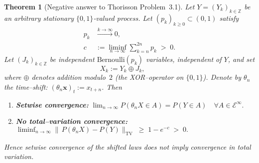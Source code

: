 \documentclass[11pt]{article}
\newtheorem{theorem}{Theorem}
\begin{document}
\begin{theorem}[Negative answer to Thorisson Problem~3.1]
Let $Y=(Y_k)_{k\in\mathbb Z}$ be an \emph{arbitrary} stationary $\{0,1\}$‑valued process.
Let $(p_k)_{k\ge0}\subset(0,1)$ satisfy
\begin{subequations}\label{eq:pconds}
\begin{align}
  p_k &\xrightarrow{k\to\infty} 0, \label{eq:p1}\\
  c  &:= \liminf_{n\to\infty}\sum_{k=n}^{2n}p_k \;>\;0. \label{eq:p2}
\end{align}
\end{subequations}
Let $(J_k)_{k\in\mathbb Z}$ be independent $\mathrm{Bernoulli}(p_k)$ variables, independent of $Y$, and set
\[
  X_k := Y_k \oplus J_k,\qquad
\]
where $\oplus$ denotes addition modulo~$2$ (the XOR–operator on $\{0,1\}$).
Denote by $\theta_n$ the time–shift: $(\theta_n\bm x)_t := x_{t+n}$.
Then
\begin{enumerate}[label=\textup{(\alph*)}]
  \item \textbf{Setwise convergence:}
        \(
          \displaystyle
          \lim_{n\to\infty} P(\theta_n X\in A)=P(Y\in A)
          \quad\forall A\in\mathcal E^{\infty}.
        \)
  \item \textbf{No total–variation convergence:}
        \(
          \displaystyle
          \liminf_{n\to\infty}
          \bigl\|\,P(\theta_n X)-P(Y)\bigr\|_{\mathrm{TV}}
          \;\ge\;1-e^{-c}\;>\;0.
        \)
\end{enumerate}
Hence setwise convergence of the shifted laws does not imply convergence in total variation.
\end{theorem}
\end{document}
